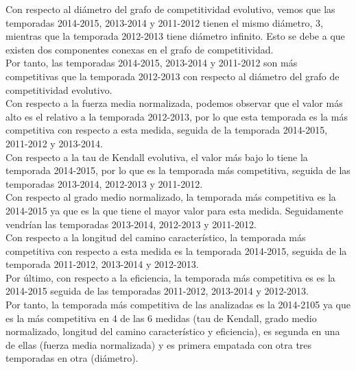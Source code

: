 Con respecto al diámetro del grafo de competitividad evolutivo, vemos que las temporadas 2014-2015, 2013-2014 y 2011-2012 tienen el mismo diámetro, 3, mientras que la temporada 2012-2013 tiene diámetro infinito. Esto se debe a que existen dos componentes conexas en el grafo de competitividad.\\
Por tanto, las temporadas 2014-2015, 2013-2014 y 2011-2012 son más competitivas que la temporada 2012-2013 con respecto al diámetro del grafo de competitividad evolutivo.\\

Con respecto a la fuerza media normalizada, podemos observar que el valor más alto es el relativo a la temporada 2012-2013, por lo que esta temporada es la más competitiva con respecto a esta medida, seguida de la temporada 2014-2015, 2011-2012 y 2013-2014.\\

Con respecto a la tau de Kendall evolutiva, el valor más bajo lo tiene la temporada 2014-2015, por lo que es la temporada más competitiva, seguida de las temporadas 2013-2014, 2012-2013 y 2011-2012.\\

Con respecto al grado medio normalizado, la temporada más competitiva es la 2014-2015 ya que es la que tiene el mayor valor para esta medida. Seguidamente vendrían las temporadas 2013-2014, 2012-2013 y 2011-2012.\\

Con respecto a la longitud del camino característico, la temporada más competitiva con respecto a esta medida es la temporada 2014-2015, seguida de la temporada 2011-2012, 2013-2014 y 2012-2013.\\

Por último, con respecto a la eficiencia, la temporada más competitiva es es la 2014-2015 seguida de las temporadas 2011-2012, 2013-2014 y 2012-2013.\\

Por tanto, la temporada más competitiva de las analizadas es la 2014-2105 ya que es la más competitiva en 4 de las 6 medidas (tau de Kendall, grado medio normalizado, longitud del camino característico y eficiencia), es segunda en una de ellas (fuerza media normalizada) y es primera empatada con otra tres temporadas en otra (diámetro). 

